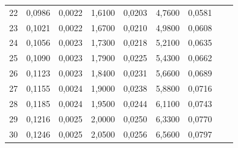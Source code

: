\documentclass[10pt,a4paper]{article}
\begin{document}
\begin{tabular}{c|c|c|c|c|c|c|c|c}
22	&	0,0986	&	0,0022	&	1,6100	&	0,0203	&	4,7600	&	0,0581	&		&		\\
23	&	0,1021	&	0,0022	&	1,6700	&	0,0210	&	4,9800	&	0,0608	&		&		\\
24	&	0,1056	&	0,0023	&	1,7300	&	0,0218	&	5,2100	&	0,0635	&		&		\\
25	&	0,1090	&	0,0023	&	1,7900	&	0,0225	&	5,4300	&	0,0662	&		&		\\
26	&	0,1123	&	0,0023	&	1,8400	&	0,0231	&	5,6600	&	0,0689	&		&		\\
27	&	0,1155	&	0,0024	&	1,9000	&	0,0238	&	5,8800	&	0,0716	&		&		\\
28	&	0,1185	&	0,0024	&	1,9500	&	0,0244	&	6,1100	&	0,0743	&		&		\\
29	&	0,1216	&	0,0025	&	2,0000	&	0,0250	&	6,3300	&	0,0770	&		&		\\
30	&	0,1246	&	0,0025	&	2,0500	&	0,0256	&	6,5600	&	0,0797	&		&		\\

\end{tabular}
\end{document}
